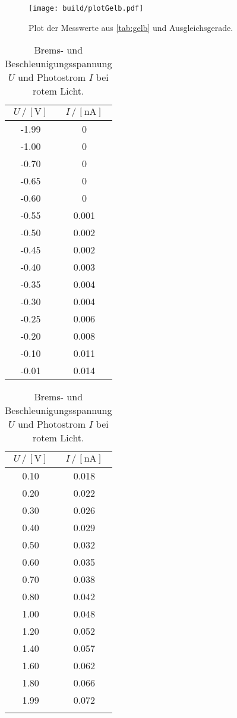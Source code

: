 \begin{figure}[H]
  \centering
  \texttt{[image: build/plotGelb.pdf]}
  \caption{Plot der Messwerte aus \autoref{tab:gelb} und Ausgleichsgerade.}
  \label{fig:plot_gelb}
\end{figure}

\begin{table}[H]
  \centering
  \caption{Brems- und Beschleunigungsspannung $U$ und Photostrom $I$ bei rotem Licht.}
  \begin{tabular}{|c|c|}
    \toprule
    $U \,/\, [\si{\volt}]$ & $I \,/\, [\si{\nano\ampere}]$\\
    \midrule
    -1.99 & 0\\
    -1.00 & 0\\
    -0.70 & 0\\
    -0.65 & 0\\
    -0.60 & 0\\
    -0.55 & 0.001\\
    -0.50 & 0.002\\
    -0.45 & 0.002\\
    -0.40 & 0.003\\
    -0.35 & 0.004\\
    -0.30 & 0.004\\
    -0.25 & 0.006\\
    -0.20 & 0.008\\
    -0.10 & 0.011\\
    -0.01 & 0.014\\
    \bottomrule
  \end{tabular}
  \begin{tabular}{|c|c|}
    \toprule
    $U \,/\, [\si{\volt}]$ & $I \,/\, [\si{\nano\ampere}]$\\
    \midrule
    0.10 & 0.018\\
    0.20 & 0.022\\
    0.30 & 0.026\\
    0.40 & 0.029\\
    0.50 & 0.032\\
    0.60 & 0.035\\
    0.70 & 0.038\\
    0.80 & 0.042\\
    1.00 & 0.048\\
    1.20 & 0.052\\
    1.40 & 0.057\\
    1.60 & 0.062\\
    1.80 & 0.066\\
    1.99 & 0.072\\
    \text{---} & \text{---}\\
    \bottomrule
  \end{tabular}
  \label{tab:rot}
\end{table}


